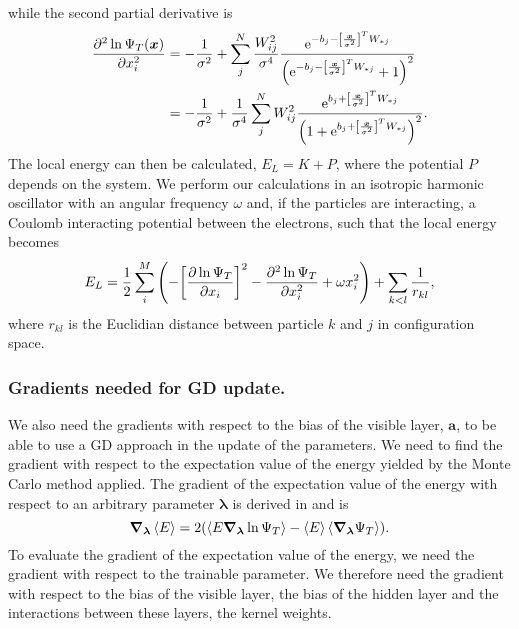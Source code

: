 while the second partial derivative is
\begin{align}
    \pdv[2]{\ln{\Psi_T\qty(\bm{x})}}{x_i} &= -\frac{1}{\sigma^2} + \sum_j^N \frac{W_{ij}^2}{\sigma^4} \frac{\mathrm{e}^{-b_j-\qty[\frac{\bm{x}}{\sigma^2}]^TW_{*j}}}{\qty(\mathrm{e}^{-b_j-\qty[\frac{\bm{x}}{\sigma^2}]^TW_{*j}} + 1)^2} \\
   &= -\frac{1}{\sigma^2} + \frac{1}{\sigma^4}\sum_j^N W_{ij}^2 \frac{\mathrm{e}^{b_j+\qty[\frac{\bm{x}}{\sigma^2}]^TW_{*j}}}{\qty(1 + \mathrm{e}^{b_j+\qty[\frac{\bm{x}}{\sigma^2}]^TW_{*j}})^2}. 
\end{align}
The local energy can then be calculated, $E_L = K + P$, where the potential $P$ depends on the system. We perform our calculations in an isotropic harmonic oscillator with an angular frequency $\omega$ and, if the particles are interacting, a Coulomb interacting potential between the electrons, such that the local energy becomes 
\begin{equation}
    E_L = \frac{1}{2}\sum_i^M\qty(-\qty[\pdv{\ln{\Psi_T}}{x_i}]^2-\pdv[2]{\ln{\Psi_T}}{x_i} + \omega x_i^2) + \sum_{k<l}\frac{1}{r_{kl}},  
\end{equation}
where $r_{kl}$ is the Euclidian distance between particle $k$ and $j$ in configuration space. 
\subsubsection{Gradients needed for GD update.}
We also need the gradients with respect to the bias of the visible layer, $\bm{a}$, to be able to use a GD approach in the update of the parameters. We need to find the gradient with respect to the expectation value of the energy yielded by the Monte Carlo method applied. The gradient of the expectation value of the energy with respect to an arbitrary parameter $\bm{\lambda}$ is derived in \citep{project1} and is 
\begin{equation}\label{eq:update_rule}
    \grad_{\bm{\lambda}}\expval{E} = 2\qty(\expval{E\grad_{\bm{\lambda}}\ln{\Psi_T}} - \expval{E}\expval{\grad_{\bm{\lambda}}\Psi_T}). 
\end{equation}
To evaluate the gradient of the expectation value of the energy, we need the gradient with respect to the trainable parameter. We therefore need the gradient with respect to the bias of the visible layer, the bias of the hidden layer and the interactions between these layers, the kernel weights. 

